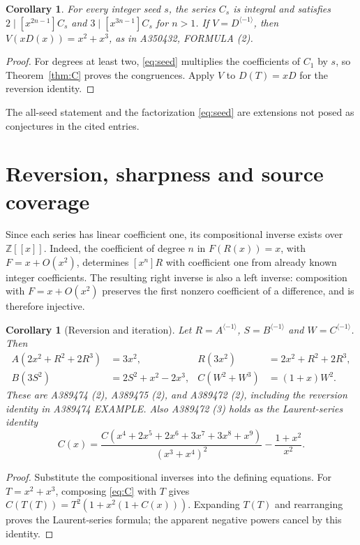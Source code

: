 \documentclass[11pt]{article}
\newtheorem{corollary}[theorem]{Corollary}
\newtheorem*{consequence}{Corollary}
\newcommand{\Z}{\mathbb Z}
\begin{document}
\begin{corollary}\label{cor:seeds}
For every integer seed $s$, the series $C_s$ is integral and satisfies
$2\mid[x^{2n-1}]C_s$ and $3\mid[x^{3n-1}]C_s$ for $n>1$.
If $V=D^{\langle-1\rangle}$, then
$V(xD(x))=x^2+x^3$, as in A350432, FORMULA (2).
\end{corollary}
\begin{proof}
For degrees at least two, \eqref{eq:seed} multiplies the coefficients
of $C_1$ by $s$, so Theorem~\ref{thm:C} proves the congruences.
Apply $V$ to $D(T)=xD$ for the reversion identity.
\end{proof}
The all-seed statement and the factorization \eqref{eq:seed} are
extensions not posed as conjectures in the cited entries.

\section{Reversion, sharpness and source coverage}

Since each series has linear coefficient one, its compositional inverse
exists over $\Z[[x]]$. Indeed, the coefficient of degree $n$ in
$F(R(x))=x$, with $F=x+O(x^2)$, determines $[x^n]R$
with coefficient one from already known integer coefficients.
The resulting right inverse is also a left inverse: composition with
$F=x+O(x^2)$ preserves the first nonzero coefficient of a difference,
and is therefore injective.

\begin{consequence}[Reversion and iteration]
Let $R=A^{\langle-1\rangle}$, $S=B^{\langle-1\rangle}$ and
$W=C^{\langle-1\rangle}$. Then
\begin{align*}
 A(2x^2+R^2+2R^3)&=3x^2, & R(3x^2)&=2x^2+R^2+2R^3,\\
 B(3S^2)&=2S^2+x^2-2x^3, & C(W^2+W^3)&=(1+x)W^2.
\end{align*}
These are A389474 (2), A389475 (2), and A389472 (2),
including the reversion identity in A389474 EXAMPLE.
Also A389472 (3) holds as the Laurent-series identity
\[
 C(x)=\frac{C(x^4+2x^5+2x^6+3x^7+3x^8+x^9)}{(x^3+x^4)^2}
       -\frac{1+x^2}{x^2}.
\]
\end{consequence}
\begin{proof}
Substitute the compositional inverses into the defining equations.
For $T=x^2+x^3$, composing \eqref{eq:C} with $T$ gives
$C(T(T))=T^2(1+x^2(1+C(x)))$.
Expanding $T(T)$ and rearranging proves the Laurent-series formula;
the apparent negative powers cancel by this identity.
\end{proof}
\end{document}
